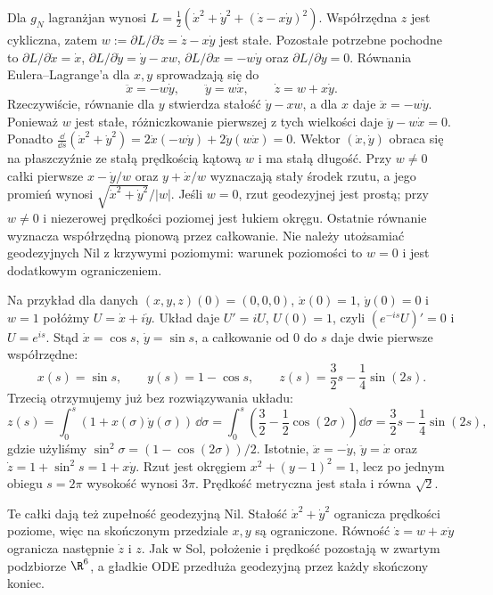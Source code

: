 \begin{przyklad}
\label{prz:thur-dop-geodezyjne-nil}
Dla $g_N$ lagranżjan wynosi
$L=\tfrac12(\dot x^2+\dot y^2+(\dot z-x\dot y)^2)$.
Współrzędna $z$ jest cykliczna, zatem
$w:=\partial L/\partial\dot z=\dot z-x\dot y$ jest stałe.
Pozostałe potrzebne pochodne to
$\partial L/\partial\dot x=\dot x$,
$\partial L/\partial\dot y=\dot y-xw$,
$\partial L/\partial x=-w\dot y$ oraz
$\partial L/\partial y=0$. Równania
Eulera--Lagrange'a dla $x,y$ sprowadzają się do
\begin{equation}\label{eq:thur-dop-nil-geodezyjne}
 \ddot x=-w\dot y,\qquad \ddot y=w\dot x,
 \qquad \dot z=w+x\dot y.
\end{equation}
Rzeczywiście, równanie dla $y$ stwierdza stałość
$\dot y-xw$, a dla $x$ daje $\ddot x=-w\dot y$.
Ponieważ $w$ jest stałe, różniczkowanie pierwszej
z tych wielkości daje $\ddot y-w\dot x=0$.
Ponadto
$\frac{\dd}{\dd s}(\dot x^2+\dot y^2)
=2\dot x(-w\dot y)+2\dot y(w\dot x)=0$.
Wektor $(\dot x,\dot y)$ obraca się na płaszczyźnie
ze stałą prędkością kątową $w$ i ma stałą długość.
Przy $w\ne0$ całki pierwsze
$x-\dot y/w$ oraz $y+\dot x/w$ wyznaczają stały środek
rzutu, a jego promień wynosi
$\sqrt{\dot x^2+\dot y^2}/|w|$.
Jeśli $w=0$, rzut geodezyjnej jest prostą;
przy $w\ne0$ i niezerowej prędkości poziomej jest łukiem okręgu.
Ostatnie równanie wyznacza współrzędną pionową przez całkowanie.
Nie należy utożsamiać geodezyjnych Nil z krzywymi poziomymi:
warunek poziomości to $w=0$ i jest dodatkowym ograniczeniem.

Na przykład dla danych $(x,y,z)(0)=(0,0,0)$,
$\dot x(0)=1$, $\dot y(0)=0$ i $w=1$ połóżmy
$U=\dot x+i\dot y$. Układ daje $U'=iU$, $U(0)=1$,
czyli $(e^{-is}U)'=0$ i $U=e^{is}$.
Stąd $\dot x=\cos s$, $\dot y=\sin s$, a całkowanie
od $0$ do $s$ daje dwie pierwsze współrzędne:
\[
 x(s)=\sin s,\qquad y(s)=1-\cos s,\qquad
 z(s)=\frac32s-\frac14\sin(2s).
\]
Trzecią otrzymujemy już bez rozwiązywania układu:
\[
 z(s)=\int_0^s(1+x(\sigma)\dot y(\sigma))\,\dd\sigma
 =\int_0^s\left(\frac32-\frac12\cos(2\sigma)\right)\dd\sigma
 =\frac32s-\frac14\sin(2s),
\]
gdzie użyliśmy $\sin^2\sigma=(1-\cos(2\sigma))/2$.
Istotnie, $\ddot x=-\dot y$, $\ddot y=\dot x$ oraz
$\dot z=1+\sin^2s=1+x\dot y$.
Rzut jest okręgiem $x^2+(y-1)^2=1$,
lecz po jednym obiegu $s=2\pi$ wysokość wynosi $3\pi$.
Prędkość metryczna jest stała i równa $\sqrt2$.

Te całki dają też zupełność geodezyjną Nil.
Stałość $\dot x^2+\dot y^2$ ogranicza prędkości poziome,
więc na skończonym przedziale $x,y$ są ograniczone.
Równość $\dot z=w+x\dot y$ ogranicza następnie
$\dot z$ i $z$. Jak w Sol, położenie i prędkość
pozostają w zwartym podzbiorze $\R^6$, a gładkie ODE
przedłuża geodezyjną przez każdy skończony koniec.
\end{przyklad}

